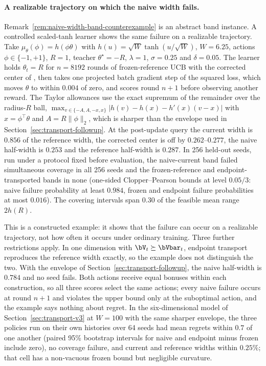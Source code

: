 
\paragraph{A realizable trajectory on which the naive width fails.}
Remark~\ref{rem:naive-width-band-counterexample} is an abstract band instance.
A controlled scaled-tanh learner shows the same failure on a realizable
trajectory. Take $\mu_\theta(\phi)=h(\phi\theta)$ with
$h(u)=\sqrt W\tanh(u/\sqrt W)$, $W=6.25$, actions $\phi\in\{-1,+1\}$, $R=1$,
teacher $\theta^\star=-R$, $\lambda=1$, $\sigma=0.25$ and $\delta=0.05$. The
learner holds $\theta_t=R$ for $n=8192$ rounds of frozen-reference UCB with the
corrected center of , then takes one projected
batch gradient step of the squared loss, which moves $\theta$ to within $0.004$
of zero, and scores round $n+1$ before observing another reward. The Taylor
allowances use the exact supremum of the remainder over the radius-$R$ ball,
$\max_{v\in\{-A,A,-x,x\}}|h(v)-h(x)-h'(x)(v-x)|$ with $x=\phi^\top\theta$ and
$A=R\|\phi\|_2$, which is sharper than the envelope used in
Section~\ref{sec:transport-followup}. At the post-update query the current
width is $0.856$ of the reference width, the corrected center is off by
$0.262$--$0.277$, the naive half-width is $0.253$ and the reference half-width
is $0.287$. In 256 held-out seeds, run under a protocol fixed before
evaluation, the naive-current band failed simultaneous coverage in all 256
seeds and the frozen-reference and endpoint-transported bands in none
(one-sided Clopper--Pearson bounds at level $0.05/3$: naive failure probability
at least $0.984$, frozen and endpoint failure probabilities at most $0.016$).
The covering intervals span $0.30$ of the feasible mean range $2h(R)$.

This is a constructed example: it shows that the failure can occur on a
realizable trajectory, not how often it occurs under ordinary training. Three
further restrictions apply. In one dimension with $\bV_t\succeq\bVbar_t$,
endpoint transport reproduces the reference width exactly, so the example does
not distinguish the two. With the envelope of
Section~\ref{sec:transport-followup}, the naive half-width is $0.784$ and no
seed fails. Both actions receive equal bonuses within each construction, so
all three scores select the same actions; every naive failure occurs at round
$n+1$ and violates the upper bound only at the suboptimal action, and the
example says nothing about regret. In the six-dimensional model of
Section~\ref{sec:transport-v3} at $W=100$ with the same sharper envelope, the
three policies run on their own histories over 64 seeds had mean regrets
within $0.7$ of one another (paired 95\% bootstrap intervals for naive and
endpoint minus frozen include zero), no coverage failure, and current and
reference widths within $0.25\%$; that cell has a non-vacuous frozen bound but
negligible curvature.
